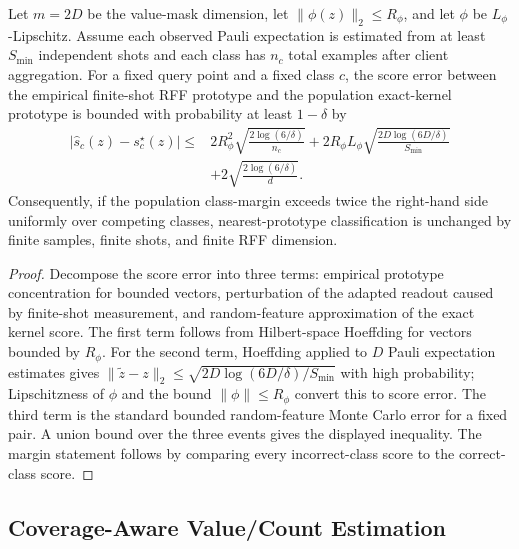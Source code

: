 \begin{theorem}
\label{thm:finite-budget}
Let \(m=2D\) be the value-mask dimension, let \(\|\phi(z)\|_2\le R_\phi\), and let \(\phi\) be \(L_\phi\)-Lipschitz. Assume each observed Pauli expectation is estimated from at least \(S_{\min}\) independent shots and each class has \(n_c\) total examples after client aggregation. For a fixed query point and a fixed class \(c\), the score error between the empirical finite-shot RFF prototype and the population exact-kernel prototype is bounded with probability at least \(1-\delta\) by
\begin{equation}
\begin{aligned}
    |\widehat{s}_c(z)-s_c^\star(z)|
    \le&
    2R_\phi^2\sqrt{\frac{2\log(6/\delta)}{n_c}}
    +2R_\phi L_\phi
    \sqrt{\frac{2D\log(6D/\delta)}{S_{\min}}}  \\
    &+
    2\sqrt{\frac{2\log(6/\delta)}{d}} .
\end{aligned}
\end{equation}
Consequently, if the population class-margin exceeds twice the right-hand side uniformly over competing classes, nearest-prototype classification is unchanged by finite samples, finite shots, and finite RFF dimension.
\end{theorem}

\begin{proof}
Decompose the score error into three terms: empirical prototype concentration for bounded vectors, perturbation of the adapted readout caused by finite-shot measurement, and random-feature approximation of the exact kernel score. The first term follows from Hilbert-space Hoeffding for vectors bounded by \(R_\phi\). For the second term, Hoeffding applied to \(D\) Pauli expectation estimates gives \(\|\tilde z-z\|_2\le\sqrt{2D\log(6D/\delta)/S_{\min}}\) with high probability; Lipschitzness of \(\phi\) and the bound \(\|\phi\|\le R_\phi\) convert this to score error. The third term is the standard bounded random-feature Monte Carlo error for a fixed pair. A union bound over the three events gives the displayed inequality. The margin statement follows by comparing every incorrect-class score to the correct-class score.
\end{proof}

\subsection{Coverage-Aware Value/Count Estimation}

